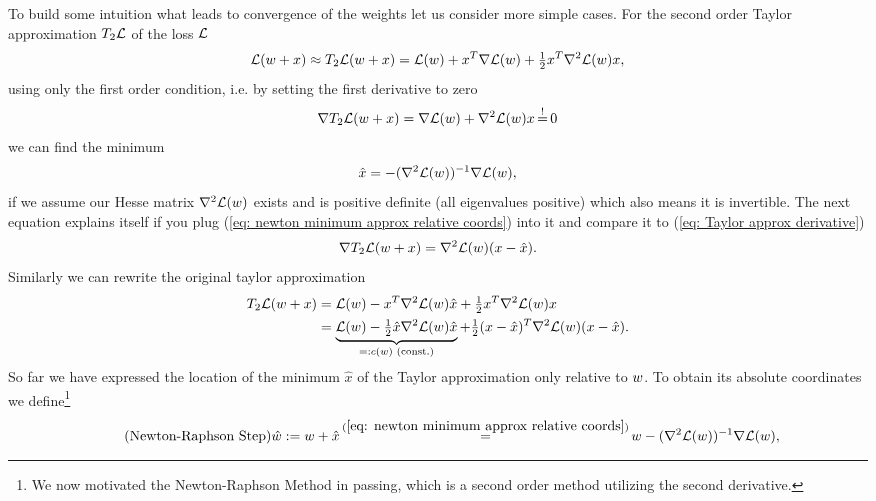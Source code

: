 To build some intuition what leads to convergence of the weights let us consider
more simple cases. For the second order Taylor approximation \(T_2\mathcal{L}\) of the
loss \(\mathcal{L}\)
%
\begin{align*}
	\mathcal{L}(w+x) \approx T_2\mathcal{L}(w+x)
	= \mathcal{L}(w) + x^T \nabla \mathcal{L}(w) + \tfrac12 x^T \nabla^2 \mathcal{L}(w) x,
\end{align*}
%
using only the first order condition, i.e. by setting the first derivative to zero
%
\begin{align}\label{eq: Taylor approx derivative}
	\nabla T_2\Loss(\weights+x) = \nabla \Loss(\weights) + \nabla^2\Loss(\weights) x \xeq{!} 0
\end{align}
%
we can find the minimum 
%
\begin{align}\label{eq: newton minimum approx relative coords}
	\hat{x} = -(\nabla^2 \mathcal{L}(w))^{-1}\nabla \mathcal{L}(w),
\end{align}
%
if we assume our Hesse matrix \(\nabla^2 \mathcal{L}(w)\) exists and is
positive definite (all eigenvalues positive) which also means it is invertible.
The next equation explains itself if you plug (\ref{eq: newton minimum approx
relative coords}) into it and compare it to (\ref{eq: Taylor approx derivative})
%
\begin{align*}
	\nabla T_2\mathcal{L}(w+x) = \nabla^2 \mathcal{L}(w)(x-\hat{x}).
\end{align*}
%
Similarly we can rewrite the original taylor approximation
%
\begin{align*}
	T_2\mathcal{L}(w+x)
	&= \mathcal{L}(w) - x^T \nabla^2 \mathcal{L}(w) \hat{x} + \tfrac12 x^T \nabla^2 \mathcal{L}(w) x \\
	&= \underbrace{
		\mathcal{L}(w) - \tfrac12 \hat{x} \nabla^2 \mathcal{L}(w) \hat{x}
	}_{
		=: c(w) \text{ (const.)}
	} + \tfrac12 (x-\hat{x})^T \nabla^2 \mathcal{L}(w)(x-\hat{x}).
\end{align*}
%
So far we have expressed the location of the minimum \(\hat{x}\) of the Taylor
approximation only relative to \(w\). To obtain its absolute coordinates
we define\footnote{We now motivated the Newton-Raphson Method in passing, which is
a second order method utilizing the second derivative.}
%
\begin{align}\label{eq: newton minimum approx}
	\tag{Newton-Raphson Step}
	\hat{\weights} := \weights + \hat{x}
	\xeq{(\ref{eq: newton minimum approx relative coords})}
	\weights -(\nabla^2 \Loss(\weights))^{-1}\nabla \Loss(\weights),
\end{align}
